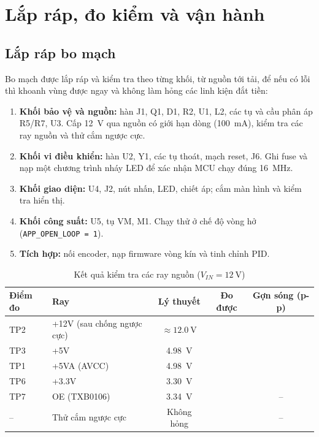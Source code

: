\chapter{Lắp ráp, đo kiểm và vận hành}
\label{ch:lapdat}

\section{Lắp ráp bo mạch}
Bo mạch được lắp ráp và kiểm tra theo từng khối, từ nguồn tới tải, để nếu có lỗi thì khoanh vùng được ngay và không làm hỏng các linh kiện đắt tiền:
\begin{enumerate}
  \item \textbf{Khối bảo vệ và nguồn:} hàn J1, Q1, D1, R2, U1, L2, các tụ và cầu phân áp R5/R7, U3. Cấp \SI{12}{\volt} qua nguồn có giới hạn dòng (\SI{100}{\milli\ampere}), kiểm tra các ray nguồn và thử cắm ngược cực.
  \item \textbf{Khối vi điều khiển:} hàn U2, Y1, các tụ thoát, mạch reset, J6. Ghi fuse và nạp một chương trình nháy LED để xác nhận MCU chạy đúng \SI{16}{\mega\hertz}.
  \item \textbf{Khối giao diện:} U4, J2, nút nhấn, LED, chiết áp; cắm màn hình và kiểm tra hiển thị.
  \item \textbf{Khối công suất:} U5, tụ VM, M1. Chạy thử ở chế độ vòng hở (\texttt{APP\_OPEN\_LOOP = 1}).
  \item \textbf{Tích hợp:} nối encoder, nạp firmware vòng kín và tinh chỉnh PID.
\end{enumerate}

\begin{table}[H]
\centering\small
\caption{Kết quả kiểm tra các ray nguồn ($V_{IN}=\SI{12}{\volt}$)}
\label{tab:rails}
\begin{tabular}{@{}llccc@{}}
\toprule
\textbf{Điểm đo} & \textbf{Ray} & \textbf{Lý thuyết} & \textbf{Đo được} & \textbf{Gợn sóng (p-p)}\\
\midrule
TP2 & +12V (sau chống ngược cực) & $\approx\SI{12.0}{\volt}$ & \bosung{} & \bosung{}\\
TP3 & +5V & \SI{4.98}{\volt} & \bosung{} & \bosung{}\\
TP1 & +5VA (AVCC) & \SI{4.98}{\volt} & \bosung{} & \bosung{}\\
TP6 & +3.3V & \SI{3.30}{\volt} & \bosung{} & \bosung{}\\
TP7 & OE (TXB0106) & \SI{3.34}{\volt} & \bosung{} & --\\
-- & Thử cắm ngược cực & Không hỏng & \bosung{} & --\\
\bottomrule
\end{tabular}
\end{table}

